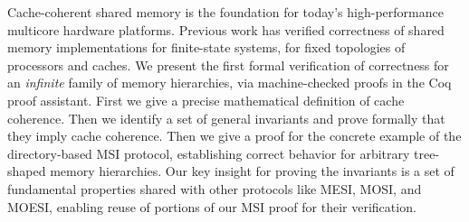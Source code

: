 Cache-coherent shared memory is the foundation for today's high-performance
multicore hardware platforms.  Previous work has verified correctness of shared
memory implementations for finite-state systems, for fixed topologies of
processors and caches.  We present the first formal verification of correctness
for an \emph{infinite} family of memory hierarchies, via machine-checked proofs
in the Coq proof assistant.  First we give a precise mathematical definition of
cache coherence. Then we identify a set of general invariants and prove
formally that they imply cache coherence. Then we give a proof for the concrete
example of the directory-based MSI protocol, establishing correct behavior for
arbitrary tree-shaped memory hierarchies.  Our key insight for proving the
invariants is a set of fundamental properties shared with other protocols like
MESI, MOSI, and MOESI, enabling reuse of portions of our MSI proof for their
verification.
